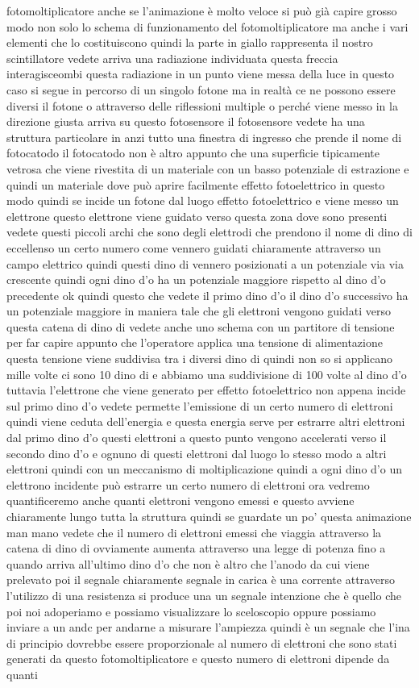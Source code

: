 fotomoltiplicatore anche se l'animazione è molto veloce si può già capire grosso modo non solo lo schema di funzionamento del fotomoltiplicatore ma anche i vari elementi che lo costituiscono quindi la parte in giallo rappresenta il nostro scintillatore vedete arriva una radiazione individuata questa freccia interagisceombi questa radiazione in un punto viene messa della luce in questo caso si segue in percorso di un singolo fotone ma in realtà ce ne possono essere diversi il fotone o attraverso delle riflessioni multiple o perché viene messo in la direzione giusta arriva su questo fotosensore il fotosensore vedete ha una struttura particolare in anzi tutto una finestra di ingresso che prende il nome di fotocatodo il fotocatodo non è altro appunto che una superficie tipicamente vetrosa che viene rivestita di un materiale con un basso potenziale di estrazione e quindi un materiale dove può aprire facilmente effetto fotoelettrico in questo modo quindi se incide un fotone dal luogo effetto fotoelettrico e viene messo un elettrone questo elettrone viene guidato verso questa zona dove sono presenti vedete questi piccoli archi che sono degli elettrodi che prendono il nome di dino di eccellenso un certo numero come vennero guidati chiaramente attraverso un campo elettrico quindi questi dino di vennero posizionati a un potenziale via via crescente quindi ogni dino d'o ha un potenziale maggiore rispetto al dino d'o precedente ok quindi questo che vedete il primo dino d'o il dino d'o successivo ha un potenziale maggiore in maniera tale che gli elettroni vengono guidati verso questa catena di dino di vedete anche uno schema con un partitore di tensione per far capire appunto che l'operatore applica una tensione di alimentazione questa tensione viene suddivisa tra i diversi dino di quindi non so si applicano mille volte ci sono 10 dino di e abbiamo una suddivisione di 100 volte al dino d'o tuttavia l'elettrone che viene generato per effetto fotoelettrico non appena incide sul primo dino d'o vedete permette l'emissione di un certo numero di elettroni quindi viene ceduta dell'energia e questa energia serve per estrarre altri elettroni dal primo dino d'o questi elettroni a questo punto vengono accelerati verso il secondo dino d'o e ognuno di questi elettroni dal luogo lo stesso modo a altri elettroni quindi con un meccanismo di moltiplicazione quindi a ogni dino d'o un elettrono incidente può estrarre un certo numero di elettroni ora vedremo quantificeremo anche quanti elettroni vengono emessi e questo avviene chiaramente lungo tutta la struttura quindi se guardate un po' questa animazione man mano vedete che il numero di elettroni emessi che viaggia attraverso la catena di dino di ovviamente aumenta attraverso una legge di potenza fino a quando arriva all'ultimo dino d'o che non è altro che l'anodo da cui viene prelevato poi il segnale chiaramente segnale in carica è una corrente attraverso l'utilizzo di una resistenza si produce una un segnale intenzione che è quello che poi noi adoperiamo e possiamo visualizzare lo sceloscopio oppure possiamo inviare a un andc per andarne a misurare l'ampiezza quindi è un segnale che l'ina di principio dovrebbe essere proporzionale al numero di elettroni che sono stati generati da questo fotomoltiplicatore e questo numero di elettroni dipende da quanti 